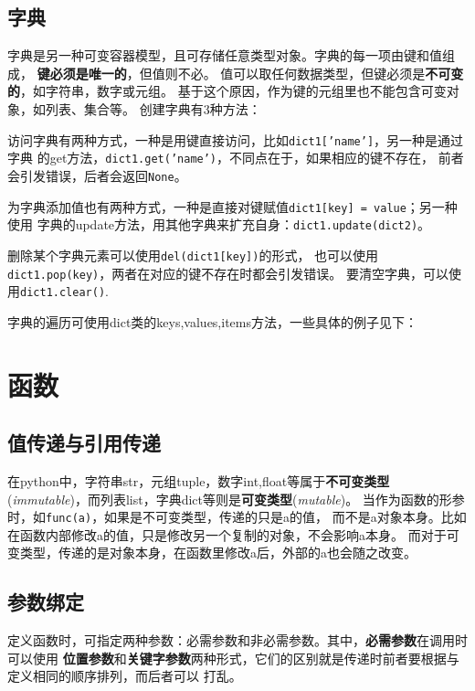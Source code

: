 \documentclass{style/ucasproposal}
\newcommand{\inlinepython}[1]{\texttt{#1}}
\begin{document}

\subsection{字典}
字典是另一种可变容器模型，且可存储任意类型对象。字典的每一项由键和值组成，
\textbf{键必须是唯一的}，但值则不必。
值可以取任何数据类型，但键必须是\textbf{不可变的}，如字符串，数字或元组。
基于这个原因，作为键的元组里也不能包含可变对象，如列表、集合等。
创建字典有3种方法：

访问字典有两种方式，一种是用键直接访问，比如\inlinepython{dict1['name']}，另一种是通过字典
的get方法，\inlinepython{dict1.get('name')}，不同点在于，如果相应的键不存在，
前者会引发错误，后者会返回\inlinepython{None}。

为字典添加值也有两种方式，一种是直接对键赋值\inlinepython{dict1[key] = value}；另一种使用
字典的update方法，用其他字典来扩充自身：\inlinepython{dict1.update(dict2)}。

删除某个字典元素可以使用\inlinepython{del(dict1[key])}的形式，
也可以使用\inlinepython{dict1.pop(key)}，两者在对应的键不存在时都会引发错误。
要清空字典，可以使用\inlinepython{dict1.clear()}.

字典的遍历可使用dict类的keys,values,items方法，一些具体的例子见下：


\section{函数}
\subsection{值传递与引用传递}
在python中，字符串str，元组tuple，数字int,float等属于\textbf{不可变类型}
(\textit{immutable})，而列表list，字典dict等则是\textbf{可变类型}(\textit{mutable})。
当作为函数的形参时，如\inlinepython{func(a)}，如果是不可变类型，传递的只是a的值，
而不是a对象本身。比如在函数内部修改a的值，只是修改另一个复制的对象，不会影响a本身。
而对于可变类型，传递的是对象本身，在函数里修改a后，外部的a也会随之改变。

\subsection{参数绑定}
定义函数时，可指定两种参数：必需参数和非必需参数。其中，\textbf{必需参数}在调用时可以使用
\textbf{位置参数}和\textbf{关键字参数}两种形式，它们的区别就是传递时前者要根据与定义相同的顺序排列，而后者可以
打乱。
\end{document}

